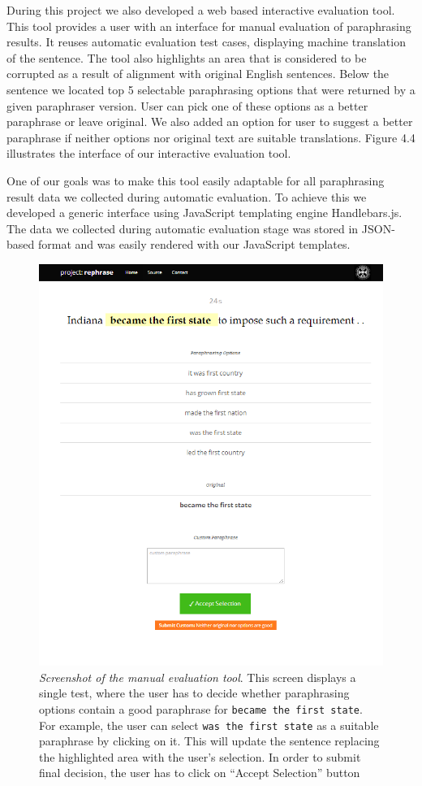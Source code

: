 During this project we also developed a web based interactive evaluation tool. This tool provides a user with an interface for manual evaluation of paraphrasing results. It reuses automatic evaluation test cases, displaying machine translation of the sentence. The tool also highlights an area that is considered to be corrupted as a result of alignment with original English sentences. Below the sentence we located top 5 selectable paraphrasing options that were returned by a given paraphraser version. User can pick one of these options as a better paraphrase or leave original. We also added an option for user to suggest a better paraphrase if neither options nor original text are suitable translations. Figure 4.4 illustrates the interface of our interactive evaluation tool. 

One of our goals was to make this tool easily adaptable for all paraphrasing result data we collected during automatic evaluation. To achieve this we developed a generic interface using JavaScript templating engine Handlebars.js. The data we collected during automatic evaluation stage was stored in JSON-based format and was easily rendered with our JavaScript templates.

\begin{figure}
 \centering 
 \includegraphics[scale=0.8]{g/man-eval.png}
 \caption{\emph{Screenshot of the manual evaluation tool}. This screen displays a single test, where the user has to decide whether paraphrasing options contain a good paraphrase for \texttt{became the first state}. For example, the user can select \texttt{was the first state} as a suitable paraphrase by clicking on it. This will update the sentence replacing the highlighted area with the user's selection. In order to submit final decision, the user has to click on ``Accept Selection'' button}
\end{figure}

